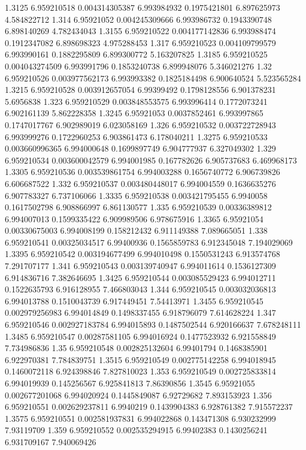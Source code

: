 {1.3125 6.959210518 0.004314305387 6.993984932 0.1975421801 6.897625973 4.584822712
1.314 6.95921052 0.004245309666 6.993986732 0.1943390748 6.898140269 4.782434043
1.3155 6.959210522 0.004177142836 6.993988474 0.1912347082 6.898698323 4.975288453
1.317 6.959210523 0.004109799579 6.993990161 0.1882295809 6.899300772 5.163207825
1.3185 6.959210525 0.004043274509 6.993991796 0.1853240738 6.899948076 5.346021276
1.32 6.959210526 0.003977562173 6.993993382 0.1825184498 6.900640524 5.523565284
1.3215 6.959210528 0.003912657054 6.99399492 0.1798128556 6.901378231 5.6956838
1.323 6.959210529 0.003848553575 6.993996414 0.1772073241 6.902161139 5.862228358
1.3245 6.95921053 0.0037852461 6.993997865 0.1747017767 6.902989019 6.023058169
1.326 6.959210532 0.003722728943 6.993999276 0.1722960253 6.903861473 6.178040211
1.3275 6.959210533 0.003660996365 6.994000648 0.1699897749 6.904777937 6.327049302
1.329 6.959210534 0.003600042579 6.994001985 0.167782626 6.905737683 6.469968173
1.3305 6.959210536 0.003539861754 6.994003288 0.1656740772 6.906739826 6.606687522
1.332 6.959210537 0.003480448017 6.994004559 0.1636635276 6.907783327 6.737106066
1.3335 6.959210538 0.003421795455 6.9940058 0.1617502798 6.908866997 6.861130577
1.335 6.959210539 0.00336389812 6.994007013 0.1599335422 6.909989506 6.978675916
1.3365 6.95921054 0.00330675003 6.994008199 0.158212432 6.911149388 7.089665051
1.338 6.959210541 0.00325034517 6.99400936 0.1565859783 6.912345048 7.194029069
1.3395 6.959210542 0.003194677499 6.994010498 0.1550531243 6.913574768 7.291707177
1.341 6.959210543 0.003139740947 6.994011614 0.1536127309 6.914836716 7.382646695
1.3425 6.959210544 0.003085529423 6.994012711 0.1522635793 6.916128955 7.466803043
1.344 6.959210545 0.003032036813 6.994013788 0.1510043739 6.917449451 7.54413971
1.3455 6.959210545 0.002979256983 6.994014849 0.1498337455 6.918796079 7.614628224
1.347 6.959210546 0.002927183784 6.994015893 0.1487502544 6.920166637 7.678248111
1.3485 6.959210547 0.00287581105 6.994016924 0.1477523932 6.921558849 7.734986836
1.35 6.959210548 0.002825132604 6.99401794 0.1468385901 6.922970381 7.784839751
1.3515 6.959210549 0.002775142258 6.994018945 0.1460072118 6.924398846 7.827810023
1.353 6.959210549 0.002725833814 6.994019939 0.145256567 6.925841813 7.86390856
1.3545 6.95921055 0.002677201068 6.994020924 0.1445849087 6.92729682 7.893153923
1.356 6.959210551 0.002629237811 6.9940219 0.1439904383 6.928761382 7.915572237
1.3575 6.959210551 0.002581937831 6.994022868 0.143471308 6.930232999 7.93119709
1.359 6.959210552 0.002535294915 6.99402383 0.1430256241 6.931709167 7.940069426
}
